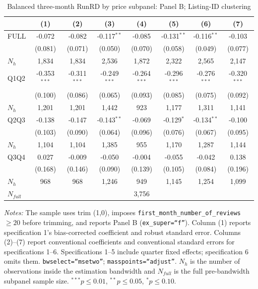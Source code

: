 \begin{table}[!htbp]
\centering
\caption{Balanced three-month RunRD by price subpanel: Panel B; Listing-ID clustering}
\scriptsize
\setlength{\tabcolsep}{5pt}
\begin{tabular}{l*{7}{c}}
\toprule
 & (1) & (2) & (3) & (4) & (5) & (6) & (7) \\
\midrule
FULL & -0.072 & -0.082 & -0.117$^{**}$ & -0.085 & -0.131$^{**}$ & -0.116$^{**}$ & -0.103 \\
 & (0.081) & (0.071) & (0.050) & (0.070) & (0.058) & (0.049) & (0.077) \\
$N_h$ & 1,834 & 1,834 & 2,536 & 1,872 & 2,322 & 2,565 & 2,147 \\
\addlinespace
Q1Q2 & -0.353$^{***}$ & -0.311$^{***}$ & -0.249$^{***}$ & -0.264$^{***}$ & -0.296$^{***}$ & -0.276$^{***}$ & -0.320$^{***}$ \\
 & (0.100) & (0.086) & (0.065) & (0.093) & (0.085) & (0.075) & (0.092) \\
$N_h$ & 1,201 & 1,201 & 1,442 & 923 & 1,177 & 1,311 & 1,141 \\
\addlinespace
Q2Q3 & -0.138 & -0.147 & -0.143$^{**}$ & -0.069 & -0.129$^{*}$ & -0.134$^{**}$ & -0.100 \\
 & (0.103) & (0.090) & (0.064) & (0.096) & (0.076) & (0.067) & (0.095) \\
$N_h$ & 1,104 & 1,104 & 1,385 & 955 & 1,170 & 1,287 & 1,144 \\
\addlinespace
Q3Q4 & 0.027 & -0.009 & -0.050 & -0.004 & -0.055 & -0.042 & 0.138 \\
 & (0.168) & (0.146) & (0.090) & (0.139) & (0.105) & (0.084) & (0.196) \\
$N_h$ & 968 & 968 & 1,246 & 949 & 1,145 & 1,254 & 1,099 \\

\midrule
$N_{full}$ & \multicolumn{7}{c}{3,756} \\
\bottomrule
\end{tabular}
\begin{minipage}{0.98\textwidth}
\footnotesize
\textit{Notes:} The sample uses trim (1,0), imposes \texttt{first\_month\_number\_of\_reviews}$\geq20$ before trimming, and reports Panel B (\texttt{ex\_super=``f''}). Column (1) reports specification 1's bias-corrected coefficient and robust standard error. Columns (2)--(7) report conventional coefficients and conventional standard errors for specifications 1--6. Specifications 1--5 include quarter fixed effects; specification 6 omits them. \texttt{bwselect=``msetwo''}; \texttt{masspoints=``adjust''}. $N_h$ is the number of observations inside the estimation bandwidth and $N_{full}$ is the full pre-bandwidth subpanel sample size. $^{***}p\leq0.01$, $^{**}p\leq0.05$, $^{*}p\leq0.10$.
\end{minipage}
\end{table}
\clearpage
